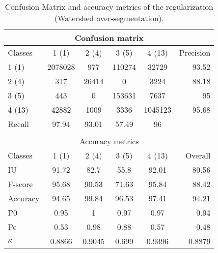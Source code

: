 \begin{table}[H]
\begin{center}
\footnotesize
\begin{tabular}{|l|c|c|c|c|r|}
\hline
\multicolumn{6}{|c|}{Confusion matrix} \\
\hline
 Classes & 1 (1) & 2 (4) & 3 (5) & 4 (13) & Precision \\
\hline
1 (1) & 2078028 & 977 & 110274 & 32729 & 93.52 \\
\hline
2 (4) & 317 & 26414 & 0 & 3224 & 88.18 \\
\hline
3 (5) & 443 & 0 & 153631 & 7637 & 95 \\
\hline
4 (13) & 42882 & 1009 & 3336 & 1045123 & 95.68 \\
\hline
Recall & 97.94 & 93.01 & 57.49 & 96 &  \\
\hline
\multicolumn{6}{c}{ } \\
\hline
\multicolumn{6}{|c|}{Accuracy metrics} \\
\hline
 Classes & 1 (1) & 2 (4) & 3 (5) & 4 (13) & Overall \\
\hline
IU & 91.72 & 82.7 & 55.8 & 92.01 & 80.56 \\
\hline
F-score & 95.68 & 90.53 & 71.63 & 95.84 & 88.42 \\
\hline
Accuracy & 94.65 & 99.84 & 96.53 & 97.41 & 94.21 \\
\hline
P0 & 0.95 & 1 & 0.97 & 0.97 & 0.94 \\
\hline
Pe & 0.53 & 0.98 & 0.88 & 0.57 & 0.48 \\
\hline
$\kappa$ & 0.8866 & 0.9045 & 0.699 & 0.9396 & 0.8879 \\
\hline
\end{tabular}
\caption{Confusion Matrix and accuracy metrics of the regularization (Watershed over-segmentation).}
\label{table:}
\end{center}
\end{table}
